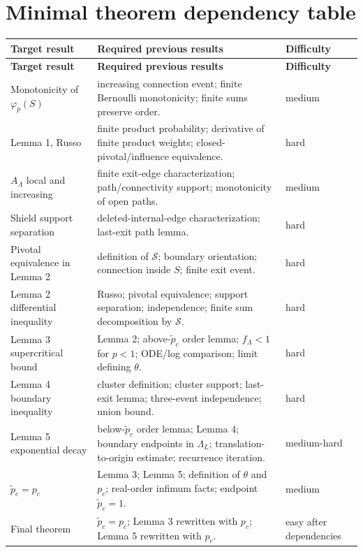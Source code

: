 \documentclass[11pt]{article}
\newcommand{\pcrit}{p_c}
\newcommand{\ptilde}{\widetilde p_c}
\newcommand{\Lam}{\Lambda}
\theoremstyle{definition}
\theoremstyle{plain}
\begin{document}
\section{Minimal theorem dependency table}

\begin{longtable}{p{}p{}p{}}
\toprule
\textbf{Target result} & \textbf{Required previous results} & \textbf{Difficulty}\\
\midrule
\endfirsthead
\toprule
\textbf{Target result} & \textbf{Required previous results} & \textbf{Difficulty}\\
\midrule
\endhead
Monotonicity of $\varphi_p(S)$
& increasing connection event; finite Bernoulli monotonicity; finite sums preserve order.
& medium\\
\addlinespace
Lemma 1, Russo
& finite product probability; derivative of finite product weights; closed-pivotal/influence equivalence.
& hard\\
\addlinespace
$A_\Lam$ local and increasing
& finite exit-edge characterization; path/connectivity support; monotonicity of open paths.
& medium\\
\addlinespace
Shield support separation
& deleted-internal-edge characterization; last-exit path lemma.
& hard\\
\addlinespace
Pivotal equivalence in Lemma 2
& definition of $\mathcal S$; boundary orientation; connection inside $S$; finite exit event.
& hard\\
\addlinespace
Lemma 2 differential inequality
& Russo; pivotal equivalence; support separation; independence; finite sum decomposition by $\mathcal S$.
& hard\\
\addlinespace
Lemma 3 supercritical bound
& Lemma 2; above-$\ptilde$ order lemma; $f_\Lam<1$ for $p<1$; ODE/log comparison; limit defining $\theta$.
& hard\\
\addlinespace
Lemma 4 boundary inequality
& cluster definition; cluster support; last-exit lemma; three-event independence; union bound.
& hard\\
\addlinespace
Lemma 5 exponential decay
& below-$\ptilde$ order lemma; Lemma 4; boundary endpoints in $\Lam_L$; translation-to-origin estimate; recurrence iteration.
& medium-hard\\
\addlinespace
$\ptilde=\pcrit$
& Lemma 3; Lemma 5; definition of $\theta$ and $\pcrit$; real-order infimum facts; endpoint $\ptilde=1$.
& medium\\
\addlinespace
Final theorem
& $\ptilde=\pcrit$; Lemma 3 rewritten with $\pcrit$; Lemma 5 rewritten with $\pcrit$.
& easy after dependencies\\
\bottomrule
\end{longtable}
\end{document}
